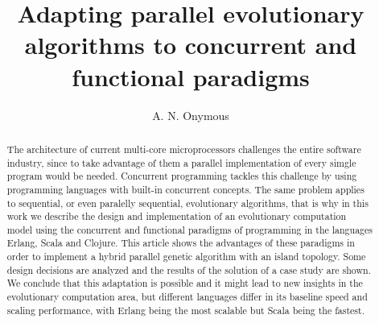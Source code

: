 \documentclass[a4paper]{llncs}
\begin{document}
\title{Adapting parallel evolutionary algorithms to concurrent and functional paradigms}

\author{A. N. Onymous}






\maketitle

\begin{abstract}
The architecture of current multi-core microprocessors  challenges the
entire software industry, since to take advantage of them  a parallel
implementation of every simgle program would be needed. Concurrent
programming tackles this challenge by using programming languages with
built-in concurrent concepts. The same problem applies to sequential,
or even paralelly sequential, evolutionary algorithms, that is why in
this work we describe the design and implementation of an evolutionary
computation model using the concurrent and functional paradigms of
programming in the languages Erlang, Scala and Clojure. This article
shows the advantages of these paradigms in order to implement a hybrid
parallel genetic algorithm with an island topology. Some design
decisions are analyzed and the results of the solution of a case study
are shown. We conclude that this adaptation is possible and it might
lead to new insights in the evolutionary computation area, but
different languages differ in its baseline speed and scaling
performance, with Erlang being the most scalable but Scala being the
fastest. 

\end{abstract}
\end{document}
